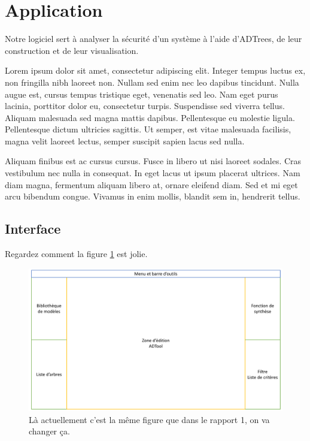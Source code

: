\section{Application}
	Notre logiciel sert à analyser la sécurité d'un système à l'aide d'ADTrees, de leur construction et de leur visualisation.

	Lorem ipsum dolor sit amet, consectetur adipiscing elit. Integer tempus luctus ex, non fringilla nibh laoreet non. Nullam sed enim nec leo dapibus tincidunt. Nulla augue est, cursus tempus tristique eget, venenatis sed leo. Nam eget purus lacinia, porttitor dolor eu, consectetur turpis. Suspendisse sed viverra tellus. Aliquam malesuada sed magna mattis dapibus. Pellentesque eu molestie ligula. Pellentesque dictum ultricies sagittis. Ut semper, est vitae malesuada facilisis, magna velit laoreet lectus, semper suscipit sapien lacus sed nulla.

	Aliquam finibus est ac cursus cursus. Fusce in libero ut nisi laoreet sodales. Cras vestibulum nec nulla in consequat. In eget lacus ut ipsum placerat ultrices. Nam diam magna, fermentum aliquam libero at, ornare eleifend diam. Sed et mi eget arcu bibendum congue. Vivamus in enim mollis, blandit sem in, hendrerit tellus.


	\subsection{Interface}
		Regardez comment la figure \ref{fig:interface} est jolie.

		\begin{figure}
			\begin{center}
				\includegraphics[width=1\textwidth]{figure/interface.pdf}
			\end{center}
			\caption{Là actuellement c'est la même figure que dans le rapport 1, on va changer ça.}
			\label{fig:interface}
		\end{figure}

